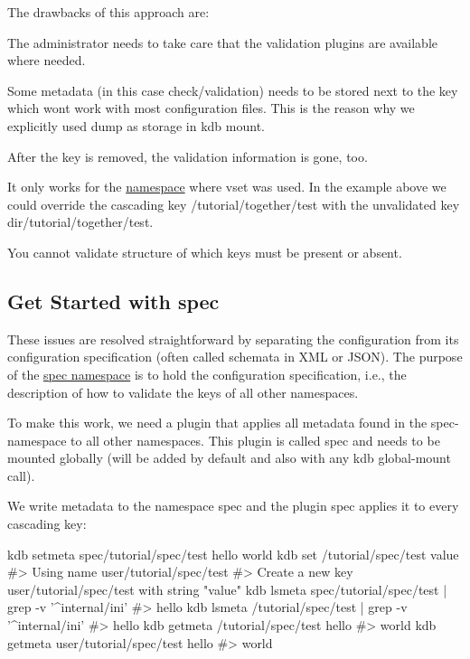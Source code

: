 The drawbacks of this approach are\+:


\begin{DoxyItemize}
\item The administrator needs to take care that the validation plugins are available where needed.
\item Some metadata (in this case {\ttfamily check/validation}) needs to be stored next to the key which won\textquotesingle{}t work with most configuration files. This is the reason why we explicitly used {\ttfamily dump} as storage in {\ttfamily kdb mount}.
\item After the key is removed, the validation information is gone, too.
\item It only works for the \hyperlink{doc_tutorials_namespaces_md}{namespace} where {\ttfamily vset} was used. In the example above we could override the cascading key {\ttfamily /tutorial/together/test} with the unvalidated key {\ttfamily dir/tutorial/together/test}.
\item You cannot validate structure of which keys must be present or absent.
\end{DoxyItemize}

\subsection*{Get Started with {\ttfamily spec}}

These issues are resolved straightforward by separating the configuration from its configuration specification (often called schemata in X\+ML or J\+S\+ON). The purpose of the \hyperlink{doc_tutorials_namespaces_md}{spec namespace} is to hold the configuration specification, i.\+e., the description of how to validate the keys of all other namespaces.

To make this work, we need a plugin that applies all metadata found in the {\ttfamily spec}-\/namespace to all other namespaces. This plugin is called {\ttfamily spec} and needs to be mounted globally (will be added by default and also with any {\ttfamily kdb global-\/mount} call).

We write metadata to the namespace {\ttfamily spec} and the plugin {\ttfamily spec} applies it to every cascading key\+:


\begin{DoxyCode}
kdb setmeta spec/tutorial/spec/test hello world
kdb set /tutorial/spec/test value
#> Using name user/tutorial/spec/test
#> Create a new key user/tutorial/spec/test with string "value"
kdb lsmeta spec/tutorial/spec/test | grep -v '^internal/ini'
#> hello
kdb lsmeta /tutorial/spec/test | grep -v '^internal/ini'
#> hello
kdb getmeta /tutorial/spec/test hello
#> world
kdb getmeta user/tutorial/spec/test hello
#> world
\end{DoxyCode}


